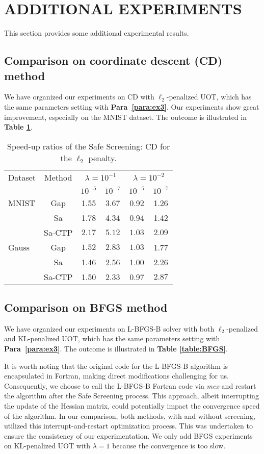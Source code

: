 \documentclass[11pt]{article}
\begin{document}
\section{ADDITIONAL EXPERIMENTS}

This section provides some additional experimental results. 



\subsection {Comparison on coordinate descent (CD) method} 
We have organized our experiments on CD with $\ell_2$-penalized UOT, which has the same parameters setting with {\bf Para~\ref{para:ex3}}. Our experiments show great improvement, especially on the MNIST dataset. The outcome is illustrated in {\bf Table {\ref{table:CD}}}.

\begin{table}[h]
\caption{Speed-up ratios of the Safe Screening: CD for the $\ell_2$ penalty.}
\label{table:CD}
\centering
\begin{tabular}{l|c|cc|cc}
\toprule
Dataset & Method & \multicolumn{2}{c}{$\lambda=10^{-1}$} & \multicolumn{2}{c}{$\lambda=10^{-2}$} \\
\cmidrule{3-6}
& & $10^{-5}$ & $10^{-7}$ & $10^{-5}$ & $10^{-7}$ \\
\midrule
MNIST & Gap & 1.55 & 3.67 & 0.92 & 1.26 \\
& Sa & 1.78 & 4.34 & 0.94 & 1.42 \\
& Sa-CTP & $\bm{2.17}$ & $\bm{5.12}$ & $\bm{1.03}$ & $\bm{2.09}$ \\
\midrule
Gauss & Gap & $\bm {1.52}$ & $\bm {2.83}$ & $\bm {1.03}$ & 1.77 \\
& Sa & 1.46 & 2.56 & 1.00 & 2.26 \\
& Sa-CTP & 1.50 & 2.33 & 0.97 & $\bm{2.87}$ \\
\bottomrule
\end{tabular}
\end{table}
\subsection{Comparison on BFGS method}
We have organized our experiments on L-BFGS-B solver \cite{DBLP:journals/toms/MoralesN11} with both $\ell_2$-penalized and KL-penalized UOT, which has the same parameters setting with {\bf Para~\ref{para:ex3}}. The outcome is illustrated in {\bf Table {\ref{table:BFGS}}}. 

It is worth noting that the original code for the L-BFGS-B algorithm is encapsulated in Fortran, making direct modifications challenging for us. Consequently, we choose to call the L-BFGS-B Fortran code via {\it mex} and restart the algorithm after the Safe Screening process. This approach, albeit interrupting the update of the Hessian matrix, could potentially impact the convergence speed of the algorithm. In our comparison, both methods, with and without screening, utilized this interrupt-and-restart optimization process. This was undertaken to ensure the consistency of our experimentation. We only add BFGS experiments on KL-penalized UOT with $\lambda = 1$ because the convergence is too slow.
\end{document}
